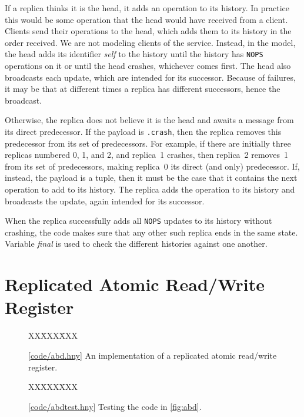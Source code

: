 \documentclass{report}
\newcommand{\harmonysource}[1]{
\begin{tabbing}
XX\=XXX\=XXX\kill
    
\end{tabbing}
}
\newcommand{\harmonylink}[1]{%
[\href{https://harmony.cs.cornell.edu/#1}{\underline{#1}}]%
}
\newenvironment{code}{
\tcolorbox
}{
\endtcolorbox
}
\begin{document}
If a replica thinks it is the head, it adds an operation to its
history.
In practice this would be some operation that the head would have received
from a client.  Clients send their operations to the head, which adds them
to its history in the order received.
We are not modeling clients of the service.
Instead, in the model, the head adds its identifier \textit{self} to the
history until the
history has \texttt{NOPS} operations on it or until the head crashes,
whichever comes first.  The head also broadcasts each update, which
are intended for its successor.  Because of failures, it may be that
at different times a replica has different successors, hence the
broadcast.

Otherwise, the replica does not believe it is the head and
awaits a message from its direct predecessor.
If the payload is \texttt{.crash}, then the replica removes this
predecessor from its set of predecessors.  For example, if there
are initially three replicas numbered 0, 1, and 2, and replica~1
crashes, then replica~2 removes~1 from its set of predecessors, making
replica~0 its direct (and only) predecessor.  If, instead, the payload
is a tuple, then it must be the case that it contains the next operation
to add to its history.  The replica adds the operation to its history
and broadcasts the update, again intended for its successor.

When the replica successfully adds all \texttt{NOPS} updates to its
history without crashing, the code makes sure that any other such replica
ends in the same state.  Variable \textit{final} is used to check the
different histories against one another.

\chapter{Replicated Atomic Read/Write Register}
\label{ch:abd}

\begin{figure}
\begin{code}
\harmonysource{abd}
\end{code}
\caption{\harmonylink{code/abd.hny} An implementation of a replicated atomic read/write register.}
\label{fig:abd}
\end{figure}

\begin{figure}
\begin{code}
\harmonysource{abdtest}
\end{code}
\caption{\harmonylink{code/abdtest.hny} Testing the code in \autoref{fig:abd}.}
\label{fig:abdtest}
\end{figure}
\end{document}
